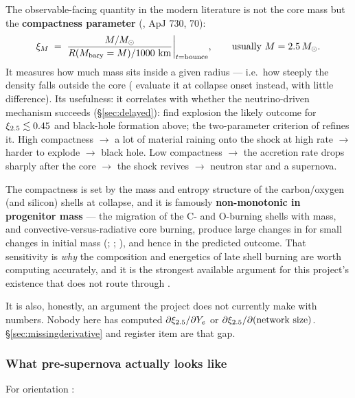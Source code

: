 The observable-facing quantity in the modern literature is not the core mass
but the \textbf{compactness parameter} (\citealt{oconnor2011}, ApJ 730, 70):
%
\begin{equation}
\xi_{M} \;=\; \frac{M/\Msun}{R(M_{\mathrm{bary}}=M)/1000\ \mathrm{km}}\bigg|_{t=\text{bounce}},
\qquad \text{usually } M = 2.5\,\Msun .
\label{eq:compactness}
\end{equation}
%
It measures how much mass sits inside a given radius --- i.e.\ how steeply the
density falls outside the core (\citealt{sukhbold2016} evaluate it at collapse
onset instead, with little difference). Its usefulness: it correlates with
whether the neutrino-driven mechanism succeeds (\S\ref{sec:delayed}):
\citet{oconnor2011} find explosion the likely outcome for $\xi_{2.5} \lesssim 0.45$
and black-hole formation above; the two-parameter criterion of
\citet{ertl2016} refines it. High compactness $\to$ a lot of material raining
onto the shock at high rate $\to$ harder to explode $\to$ black hole. Low
compactness $\to$ the accretion rate drops sharply after the core $\to$ the
shock revives $\to$ neutron star and a supernova.

The compactness is set by the mass and entropy structure of the carbon/oxygen
(and silicon) shells at collapse, and it is famously \textbf{non-monotonic in
progenitor mass} --- the migration of the C- and O-burning shells with mass,
and convective-versus-radiative core burning, produce large changes in \xic{}
for small changes in initial mass (\citealt[\S 4.6]{oconnor2011};
\citealt[\S 7.1]{sukhbold2016}; \citealt{sukhbold2018}), and hence in the
predicted outcome. That sensitivity is \emph{why} the composition and
energetics of late shell burning are worth computing accurately, and it is the
strongest available argument for this project's existence that does not route
through \Mch.

It is also, honestly, an argument the project does not currently make with
numbers. Nobody here has computed $\partial\xi_{2.5}/\partial Y_{e}$ or
$\partial\xi_{2.5}/\partial(\text{network size})$. \S\ref{sec:missingderivative} and
register item  are that gap.

\subsubsection{What pre-supernova \texorpdfstring{\Ye}{Ye} actually looks like}
\label{sec:presnye}

For orientation :


